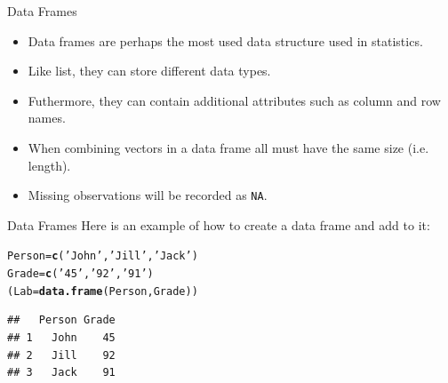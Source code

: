 \documentclass[xcolor=svgnames, 10pt]{beamer}
\makeatletter
\newcommand{\hlnum}[1]{\textcolor[rgb]{0.686,0.059,0.569}{#1}}%
\newcommand{\hlstr}[1]{\textcolor[rgb]{0.192,0.494,0.8}{#1}}%
\newcommand{\hlcom}[1]{\textcolor[rgb]{0.678,0.584,0.686}{\textit{#1}}}%
\newcommand{\hlopt}[1]{\textcolor[rgb]{0,0,0}{#1}}%
\newcommand{\hlstd}[1]{\textcolor[rgb]{0.345,0.345,0.345}{#1}}%
\newcommand{\hlkwb}[1]{\textcolor[rgb]{0.69,0.353,0.396}{#1}}%
\newcommand{\hlkwd}[1]{\textcolor[rgb]{0.737,0.353,0.396}{\textbf{#1}}}%
\newenvironment{kframe}{%
 \def\at@end@of@kframe{}%
 \ifinner\ifhmode%
  \def\at@end@of@kframe{\end{minipage}}%
  \begin{minipage}{\columnwidth}%
 \fi\fi%
 \def\FrameCommand##1{\hskip\@totalleftmargin \hskip-\fboxsep
 \colorbox{shadecolor}{##1}\hskip-\fboxsep
     \hskip-\linewidth \hskip-\@totalleftmargin \hskip\columnwidth}%
 \MakeFramed {\advance\hsize-\width
   \@totalleftmargin\z@ \linewidth\hsize
   \@setminipage}}%
 {\par\unskip\endMakeFramed%
 \at@end@of@kframe}
\newenvironment{knitrout}{}{} %
\makeatother
\begin{document}



\begin{frame}[fragile]{Data Frames}
\begin{itemize}
\item Data frames are perhaps the most used data structure used in statistics. 
\item Like list, they can store different data types.
\item Futhermore, they can contain  additional attributes such as column and row names. \item When combining vectors in a data frame  all must have the same size (i.e. length).  \item Missing observations will be recorded as \texttt{NA}.
\end{itemize}
\end{frame}

\begin{frame}[fragile]{Data Frames}
Here is an example of how to create a data frame and add to it: 
\begin{knitrout}\footnotesize
{}\color{fgcolor}\begin{kframe}
\begin{alltt}
\hlstd{Person}\hlkwb{=}\hlkwd{c}\hlstd{(}\hlstr{'John'}\hlstd{,} \hlstr{'Jill'}\hlstd{,} \hlstr{'Jack'}\hlstd{)}
\hlstd{Grade}\hlkwb{=}\hlkwd{c}\hlstd{(}\hlstr{'45'}\hlstd{,}\hlstr{'92'}\hlstd{,}\hlstr{'91'}\hlstd{)}
\hlstd{(Lab}\hlkwb{=}\hlkwd{data.frame}\hlstd{(Person, Grade))}
\end{alltt}
\begin{verbatim}
##   Person Grade
## 1   John    45
## 2   Jill    92
## 3   Jack    91
\end{verbatim}
\end{kframe}
\end{knitrout}
\end{frame}
\end{document}
